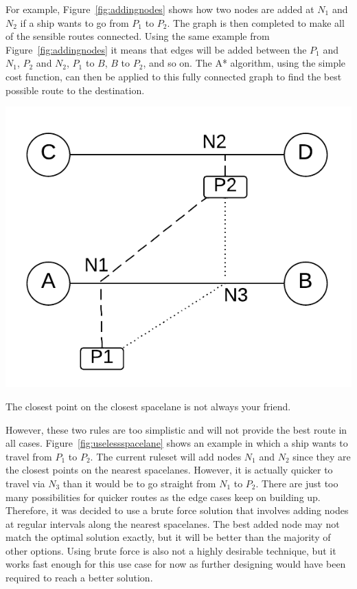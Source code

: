 For example, Figure~\ref{fig:addingnodes} shows how two nodes are added at $N_1$ and $N_2$ if a ship wants to go from $P_1$ to $P_2$. The graph is then completed to make all of the sensible routes connected. Using the same example from Figure~\ref{fig:addingnodes} it means that edges will be added between the $P_1$ and $N_1$, $P_2$ and $N_2$, $P_1$ to $B$, $B$ to $P_2$, and so on. The A* algorithm, using the simple cost function, can then be applied to this fully connected graph to find the best possible route to the destination.

\begin{marginfigure}
	\includegraphics{res/pathfinding/NearestSpaceLaneUseless.pdf}
	\caption[The closest point on the closest spacelane is not always your friend]{The closest point on the closest spacelane is not always your friend.}
	\label{fig:uselessspacelane}
\end{marginfigure}

However, these two rules are too simplistic and will not provide the best route in all cases. Figure~\ref{fig:uselessspacelane} shows an example in which a ship wants to travel from $P_1$ to $P_2$. The current ruleset will add nodes $N_1$ and $N_2$ since they are the closest points on the nearest spacelanes. However, it is actually quicker to travel via $N_3$ than it would be to go straight from $N_1$ to $P_2$. There are just too many possibilities for quicker routes as the edge cases keep on building up. Therefore, it was decided to use a brute force solution that involves adding nodes at regular intervals along the nearest spacelanes. The best added node may not match the optimal solution exactly, but it will be better than the majority of other options. Using brute force is also not a highly desirable technique, but it works fast enough for this use case for now as further designing would have been required to reach a better solution.

